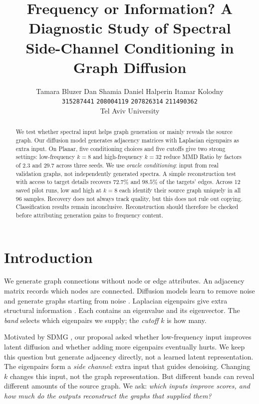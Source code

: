 \documentclass[11pt]{article}
\title{Frequency or Information? A Diagnostic Study of Spectral\\Side-Channel Conditioning in Graph Diffusion}
\author{
  Tamara Bluzer \quad Dan Shamia \quad Daniel Halperin \quad Itamar Kolodny \\
  \texttt{315287441} \quad \texttt{208004119} \quad \texttt{207826314} \quad \texttt{211490362} \\
  Tel Aviv University
}
\begin{document}
\maketitle

\begin{abstract}
We test whether spectral input helps graph generation or mainly reveals the source graph.
Our diffusion model generates adjacency matrices with Laplacian eigenpairs as extra input.
On Planar, five conditioning choices and five cutoffs give two strong settings: low-frequency
$k{=}8$ and high-frequency $k{=}32$ reduce MMD Ratio by factors of $2.3$ and $29.7$ across
three seeds. We use \emph{oracle conditioning}: input from real validation graphs, not
independently generated spectra. A simple reconstruction test with access to target details
recovers $72.7\%$ and $98.5\%$ of the targets' edges. Across 12 saved pilot runs, low and high
at $k{=}8$ each identify their source graph uniquely in all 96 samples. Recovery does not
always track quality, but this does not rule out copying. Classification results remain
inconclusive. Reconstruction should therefore be checked before attributing generation gains
to frequency content.
\end{abstract}

\section{Introduction}
\label{sec:intro}
We generate graph connections without node or edge attributes. An adjacency matrix records
which nodes are connected. Diffusion models learn to remove noise and generate graphs starting
from noise \citep{niu2020edpgnn,jo2022gdss,vignac2023digress}. Laplacian eigenpairs give extra
structural information \citep{martinkus2022spectre,minello2025ggsd}. Each contains an eigenvalue
and its eigenvector. The \emph{band} selects which eigenpairs we supply; the \emph{cutoff} $k$
is how many.

Motivated by SDMG \citep{zhu2025sdmg}, our proposal asked whether low-frequency input improves
latent diffusion and whether adding more eigenpairs eventually hurts. We keep this question
but generate adjacency directly, not a learned latent representation. The eigenpairs form a
\emph{side channel}: extra input that guides denoising. Changing $k$ changes this input, not
the graph representation. But different bands can reveal different amounts of the source
graph. We ask: \emph{which inputs improve scores, and how much do the outputs reconstruct
the graphs that supplied them?}
\end{document}

